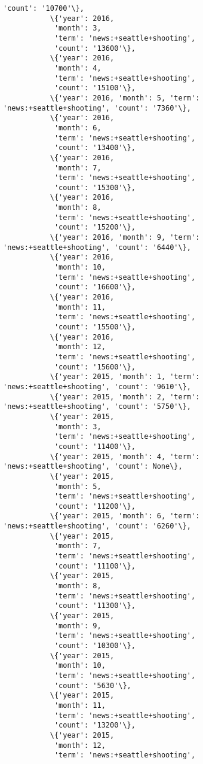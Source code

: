 \documentclass[11pt]{article}
\begin{document}
\begin{Verbatim}[commandchars=\\\{\}]
            'count': '10700'\},
           \{'year': 2016,
            'month': 3,
            'term': 'news:+seattle+shooting',
            'count': '13600'\},
           \{'year': 2016,
            'month': 4,
            'term': 'news:+seattle+shooting',
            'count': '15100'\},
           \{'year': 2016, 'month': 5, 'term': 'news:+seattle+shooting', 'count': '7360'\},
           \{'year': 2016,
            'month': 6,
            'term': 'news:+seattle+shooting',
            'count': '13400'\},
           \{'year': 2016,
            'month': 7,
            'term': 'news:+seattle+shooting',
            'count': '15300'\},
           \{'year': 2016,
            'month': 8,
            'term': 'news:+seattle+shooting',
            'count': '15200'\},
           \{'year': 2016, 'month': 9, 'term': 'news:+seattle+shooting', 'count': '6440'\},
           \{'year': 2016,
            'month': 10,
            'term': 'news:+seattle+shooting',
            'count': '16600'\},
           \{'year': 2016,
            'month': 11,
            'term': 'news:+seattle+shooting',
            'count': '15500'\},
           \{'year': 2016,
            'month': 12,
            'term': 'news:+seattle+shooting',
            'count': '15600'\},
           \{'year': 2015, 'month': 1, 'term': 'news:+seattle+shooting', 'count': '9610'\},
           \{'year': 2015, 'month': 2, 'term': 'news:+seattle+shooting', 'count': '5750'\},
           \{'year': 2015,
            'month': 3,
            'term': 'news:+seattle+shooting',
            'count': '11400'\},
           \{'year': 2015, 'month': 4, 'term': 'news:+seattle+shooting', 'count': None\},
           \{'year': 2015,
            'month': 5,
            'term': 'news:+seattle+shooting',
            'count': '11200'\},
           \{'year': 2015, 'month': 6, 'term': 'news:+seattle+shooting', 'count': '6260'\},
           \{'year': 2015,
            'month': 7,
            'term': 'news:+seattle+shooting',
            'count': '11100'\},
           \{'year': 2015,
            'month': 8,
            'term': 'news:+seattle+shooting',
            'count': '11300'\},
           \{'year': 2015,
            'month': 9,
            'term': 'news:+seattle+shooting',
            'count': '10300'\},
           \{'year': 2015,
            'month': 10,
            'term': 'news:+seattle+shooting',
            'count': '5630'\},
           \{'year': 2015,
            'month': 11,
            'term': 'news:+seattle+shooting',
            'count': '13200'\},
           \{'year': 2015,
            'month': 12,
            'term': 'news:+seattle+shooting',

\end{Verbatim}
\end{document}
